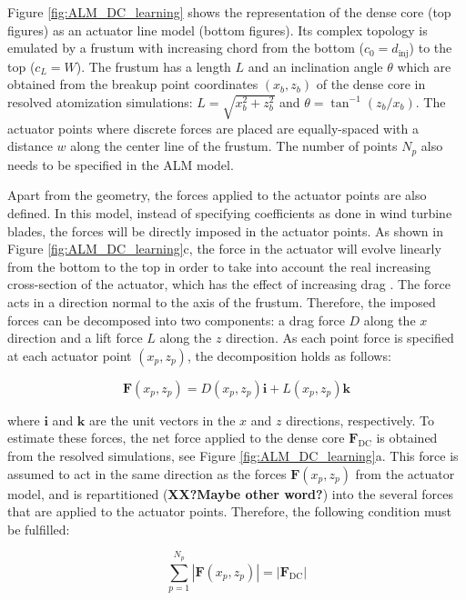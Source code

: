 Figure \ref{fig:ALM_DC_learning} shows the representation of the dense core (top figures) as an actuator line model (bottom figures). Its complex topology is emulated by a frustum with increasing chord from the bottom ($c_0 = d_\mathrm{inj}$) to the top ($c_L = W$). The frustum has a length $L$ and an inclination angle $\theta$ which are obtained from the breakup point coordinates $(x_b, z_b)$ of the dense core in resolved atomization simulations: $L = \sqrt{x_b^2 + z_b^2}$ and $\theta = \tan^{-1} \left( z_b / x_b\right)$. The actuator points where discrete forces are placed are equally-spaced with a distance $w$ along the center line of the frustum. The number of points $N_p$ also needs to be specified in the ALM model.

Apart from the geometry, the forces applied to the actuator points are also defined. In this model, instead of specifying coefficients as done in wind turbine blades, the forces will be directly imposed in the actuator points. As shown in Figure \ref{fig:ALM_DC_learning}c, the force in the actuator will evolve linearly from the bottom to the top in order to take into account the real increasing cross-section of the actuator, which has the effect of increasing drag . The force acts in a direction normal to the axis of the frustum. Therefore, the imposed forces can be decomposed into two components: a drag force $D$ along the $x$ direction and a lift force $L$ along the $z$ direction. As each point force is specified at each actuator point $\left( x_p, z_p \right)$, the decomposition holds as follows:

\begin{equation}
\textbf{F} \left( x_p, z_p \right) = D \left( x_p, z_p \right) \textbf{i} + L \left( x_p, z_p \right) \textbf{k} 
\end{equation}

where $\textbf{i}$ and $\textbf{k}$ are the unit vectors in the $x$ and $z$ directions, respectively. To estimate these forces, the net force applied to the dense core $\textbf{F}_\mathrm{DC}$ is obtained from the resolved simulations, see Figure \ref{fig:ALM_DC_learning}a. This force is assumed to act in the same direction as the forces $\textbf{F} \left( x_p, z_p \right)$ from the actuator model, and is repartitioned (\textbf{XX?Maybe other word?}) into the several forces that are applied to the actuator points. Therefore, the following condition must be fulfilled:

\begin{equation}
\sum_{p=1}^{N_p} | \textbf{F} \left( x_p, z_p \right)| = | \textbf{F}_\mathrm{DC} |
\end{equation}

